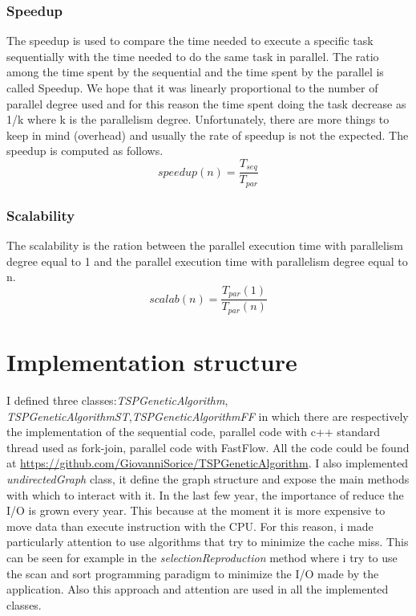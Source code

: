 \documentclass[a4paper,10pt]{article}
\begin{document}
	\subsubsection{Speedup}
	The speedup is used to compare the time needed to execute a specific task sequentially with the time needed to do the same task in parallel. The ratio among the time spent by the sequential and the time spent by the parallel is called Speedup. We hope that it was linearly proportional to the number of parallel degree used and for this reason the time spent doing the task decrease as 1/k where k is the parallelism degree. Unfortunately, there are more things to keep in mind (overhead) and usually the rate of speedup is not the expected.
	The speedup is computed as follows.
	\begin{equation}
	speedup(n)=\frac{T_{seq}}{T_{par}}
	\end{equation}
	
	\subsubsection{Scalability}
	The scalability is the ration between the parallel execution time with parallelism degree equal to 1 and the parallel execution time with parallelism degree equal to n.
		\begin{equation}
	scalab(n)=\frac{T_{par}(1)}{T_{par}(n)}
	\end{equation}
	\section{Implementation structure}
	I defined three classes:\textit{TSPGeneticAlgorithm}, \textit{TSPGeneticAlgorithmST},\textit{TSPGeneticAlgorithmFF} in which there are respectively the implementation of the sequential code, parallel code with c++ standard thread used as fork-join, parallel code with FastFlow.
	All the code could be found at \url{https://github.com/GiovanniSorice/TSPGeneticAlgorithm}.
	I also implemented \textit{undirectedGraph} class, it define the graph structure and expose the main methods with which to interact with it.
	In the last few year, the importance of reduce the I/O is grown every year. This because at the moment it is more expensive to move data than execute instruction with the CPU. For this reason, i made particularly attention to use algorithms that try to minimize the cache miss. This can be seen for example in the \textit{selectionReproduction} method where i try to use the scan and sort programming paradigm to minimize the I/O made by the application. Also this approach and attention are used in all the implemented classes.
\end{document}
